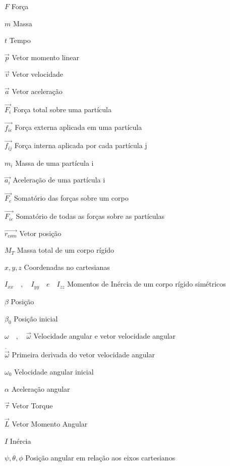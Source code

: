 \begin{simbolos}
  \item[$F$] Força
  \item[$m$] Massa
  \item[$t$] Tempo
  \item[$\vec{p}$] Vetor momento linear
  \item[$\vec{v}$] Vetor velocidade
  \item[$\vec{a}$] Vetor aceleração
  \item[$\vec{F_i}$] Força total sobre uma partícula
  \item[$\vec{f_{ie}}$] Força externa aplicada em uma partícula
  \item[$\vec{f_{ij}}$] Força interna aplicada por cada partícula j
  \item[$m_i$] Massa de uma partícula i
  \item[$\vec{a_i}$] Aceleração de uma partícula i
  \item[$\vec{F_e}$] Somatório das forças sobre um corpo
  \item[$\vec{F_{ie}}$] Somatório de todas as forças sobre as partículas
  \item[$\vec{r_{com}}$] Vetor posição 
  \item[$M_T$] Massa total de um corpo rígido
  \item[$x,y,z$] Coordenadas no cartesianas
  \item[$I_{xx}\quad,\quad I_{yy} \quad e \quad I_{zz}$] Momentos de Inércia de um corpo rígido simétricos 
  \item[$\beta$] Posição
  \item[$\beta_0$] Posição inicial
  \item[$\omega \quad, \quad \vec{\omega}$] Velocidade angular e vetor velocidade angular
  \item[$\dot{\vec{\omega}}$] Primeira derivada do vetor velocidade angular
  \item[$\omega_0$] Velocidade angular inicial
  \item[$\alpha$] Aceleração angular
  \item[$\vec{\tau}$] Vetor Torque
  \item[$\vec{L}$] Vetor Momento Angular
  \item[$I$] Inércia
  \item[$\psi, \theta, \phi$] Posição angular em relação aos eixos cartesianos

\end{simbolos}
